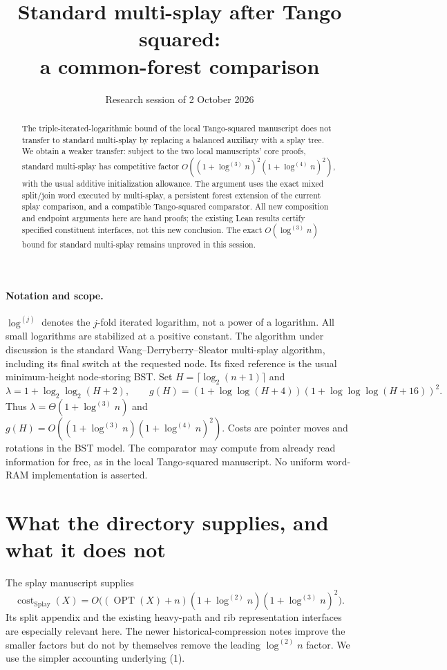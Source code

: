 \documentclass[11pt]{article}
\title{Standard multi-splay after Tango squared:\\a common-forest comparison}
\author{Research session of 2 October 2026}
\date{}
\newcommand{\OPT}{\operatorname{OPT}}
\newcommand{\cost}{\operatorname{cost}}
\newcommand{\Splay}{\operatorname{Splay}}
\newcommand{\lgit}[1]{\log^{(#1)}}
\begin{document}
\maketitle

\begin{abstract}
The triple-iterated-logarithmic bound of the local Tango-squared
manuscript does not transfer to standard multi-splay by replacing a
balanced auxiliary with a splay tree. We obtain a weaker transfer:
subject to the two local manuscripts' core proofs, standard multi-splay
has competitive factor
$O((1+\lgit{3}n)^2(1+\lgit{4}n)^2)$, with the usual additive
initialization allowance. The argument uses the exact mixed split/join
word executed by multi-splay, a persistent forest extension of the
current splay comparison, and a compatible Tango-squared comparator.
All new composition and endpoint arguments here are hand proofs;
the existing Lean results certify specified constituent interfaces,
not this new conclusion. The exact $O(\lgit{3}n)$ bound for standard
multi-splay remains unproved in this session.
\end{abstract}

\paragraph{Notation and scope.}
$\lgit{j}$ denotes the $j$-fold iterated logarithm, not a power of a
logarithm. All small logarithms are stabilized at a positive constant.
The algorithm under discussion is the standard Wang--Derryberry--Sleator
multi-splay algorithm, including its final switch at the requested node.
Its fixed reference is the usual minimum-height node-storing BST.
Set $H=\lceil\log_2(n+1)\rceil$ and
\[
 \lambda=1+\log_2\log_2(H+2),\qquad
 g(H)=(1+\log\log(H+4))(1+\log\log\log(H+16))^2.
\]
Thus $\lambda=\Theta(1+\lgit{3}n)$ and
$g(H)=O((1+\lgit{3}n)(1+\lgit{4}n)^2)$.
Costs are pointer moves and rotations in the BST model. The comparator
may compute from already read information for free, as in the local
Tango-squared manuscript. No uniform word-RAM implementation is asserted.

\section{What the directory supplies, and what it does not}

The splay manuscript supplies
\[
 \cost_{\Splay}(X)=
 O\bigl((\OPT(X)+n)(1+\lgit{2}n)(1+\lgit{3}n)^2\bigr).
                                                        \tag{1}
\]
Its split appendix and the existing heavy-path and rib representation
interfaces are especially relevant here. The newer historical-compression
notes improve the smaller factors but do not by themselves remove the
leading $\lgit{2}n$ factor. We use the simpler accounting underlying (1).
\end{document}
